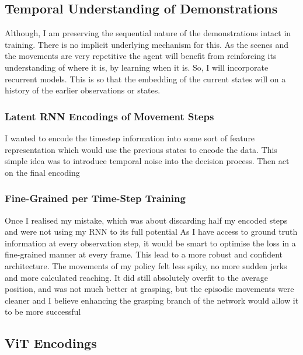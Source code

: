 \subsection{Temporal Understanding of Demonstrations}
Although, I am preserving the sequential nature of the demonstrations intact in training. There is no implicit underlying mechanism for this. As the scenes and the movements are very repetitive the agent will benefit from reinforcing its understanding of where it is, by learning when it is. So, I will incorporate recurrent models. This is so that the embedding of the current states will on a history of the earlier observations or states.

\subsubsection{Latent RNN Encodings of Movement Steps}
I wanted to encode the timestep information into some sort of feature representation which would use the previous states to encode the data. This simple idea was to introduce temporal noise into the decision process. Then act on the final encoding



\subsubsection{Fine-Grained per Time-Step Training}
Once I realised my mistake, which was about discarding half my encoded steps and were not using my RNN to its full potential  As I have access to ground truth information at every observation step, it would be smart to optimise the loss in a fine-grained manner at every frame.
This lead to a more robust and confident architecture. The movements of my policy felt less spiky, no more sudden jerks and more calculated reaching. It did still absolutely overfit to the average position, and was not much better at grasping, but the episodic movements were cleaner and I believe enhancing the grasping branch of the network would allow it to be more successful 


\subsection{ViT Encodings}

